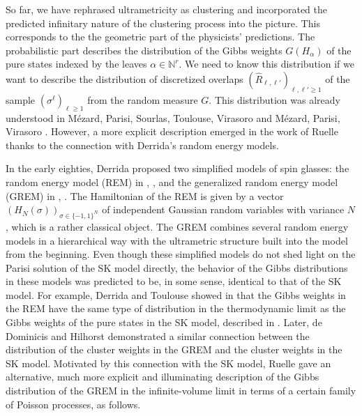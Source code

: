 \documentclass[12pt]{article}
\newcommand{\Natural}{\mathbb{N}}
\theoremstyle{nonumberplain}
\begin{document}
So far, we have rephrased ultrametricity as clustering and incorporated the predicted infinitary nature of the clustering process into the picture. This corresponds to the the geometric part of the physicists' predictions. The probabilistic part describes the distribution of the Gibbs weights $G(H_\alpha)$ of the pure states indexed by the leaves $\alpha\in\Natural^r$. We need to know this distribution if we want to describe the distribution of discretized overlaps $(\hat{R}_{\ell,\ell'})_{\ell,\ell'\geq 1}$ of the sample $(\sigma^\ell)_{\ell\geq 1}$ from the random measure $G$. This distribution was already understood in M\'ezard, Parisi, Sourlas, Toulouse, Virasoro \cite{M1} and M\'ezard, Parisi, Virasoro \cite{MPV0}. However, a more explicit description emerged in the work of Ruelle \cite{Ruelle} thanks to the connection with Derrida's random energy models. 

In the early eighties, Derrida proposed two simplified models of spin glasses: the random energy model (REM) in \cite{DerridaREM1}, \cite{DerridaREM2}, and the generalized random energy model (GREM) in \cite{DerridaGREM}, \cite{DerridaGREM2}. The Hamiltonian of the REM is given by a vector $(H_N(\sigma))_{\sigma\in\{-1,1\}^N}$ of independent Gaussian random variables with variance $N$, which is a rather classical object. The GREM combines several random energy models in a hierarchical way with the ultrametric structure built into the model from the beginning. Even though these simplified models do not shed light on the Parisi solution of the SK model directly, the behavior of the Gibbs distributions in these models was predicted to be, in some sense, identical to that of the SK model. For example, Derrida and Toulouse showed in \cite{DerridaToulouse} that the Gibbs weights in the REM have the same type of distribution in the thermodynamic limit as the Gibbs weights of the pure states in the SK model, described in \cite{M1}. Later, de Dominicis and Hilhorst \cite{deDH} demonstrated a similar connection between the distribution of the cluster weights in the GREM and the cluster weights in the SK model. Motivated by this connection with the SK model, Ruelle \cite{Ruelle} gave an alternative, much more explicit and illuminating description of the Gibbs distribution of the GREM in the infinite-volume limit  in terms of a certain family of Poisson processes, as follows. 
\end{document}
